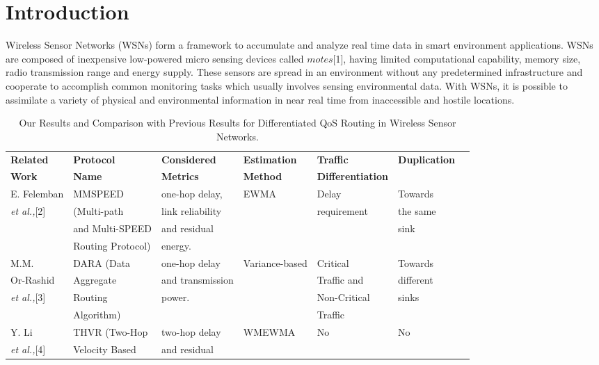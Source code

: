 \documentclass[fleqn,twoside]{article}
\begin{document}
\section{Introduction}
\label{section:Introduction}
Wireless Sensor Networks (WSNs) form a framework to accumulate and analyze real time data in smart environment applications. WSNs are composed of inexpensive low-powered micro sensing devices called $motes$[1], having limited computational capability, memory size, radio transmission range and energy supply.
These sensors are spread in an environment without any predetermined infrastructure and cooperate to accomplish common monitoring tasks which usually involves sensing environmental data. With WSNs, it is possible to assimilate a variety of physical and environmental information in near real time from inaccessible and hostile locations. 
\newcommand {\otoprule}{\midrule [\heavyrulewidth]}  \begin{table*}
\centering
\caption{Our Results and Comparison with Previous Results for Differentiated QoS Routing in Wireless Sensor Networks.}
\begin{center}
\scriptsize	
\begin{tabular}{lllllll}
    \hline
\bfseries {Related} & \bfseries {Protocol} & \bfseries {Considered} & \bfseries {Estimation} & \bfseries {Traffic} & \bfseries {Duplication} \\ 
\bfseries {Work}    &  \bfseries {Name}    & \bfseries {Metrics}    & \bfseries {Method} & \bfseries {Differentiation} & \bfseries \\
\hline
    E. Felemban & MMSPEED &one-hop delay, &EWMA &Delay &Towards \\
    \emph{et al.,}[2] &(Multi-path &link reliability & &requirement &the same \\
    &and Multi-SPEED &and residual & & &sink \\
    &Routing Protocol) &energy. & & & &\\
\hline
    M.M. & DARA (Data  &one-hop delay &Variance-based &Critical &Towards \\
    Or-Rashid  &Aggregate &and transmission & &Traffic and &different \\
    \emph{et al.,}[3] &Routing  &power. & &Non-Critical &sinks \\
    &Algorithm) & & &Traffic &\\
\hline
    Y. Li & THVR (Two-Hop &two-hop delay &WMEWMA &No &No \\
    \emph{et al.,}[4] &Velocity Based &and residual & & & \\

\end{tabular}
\end{center}
\end{table*}
\end{document}
